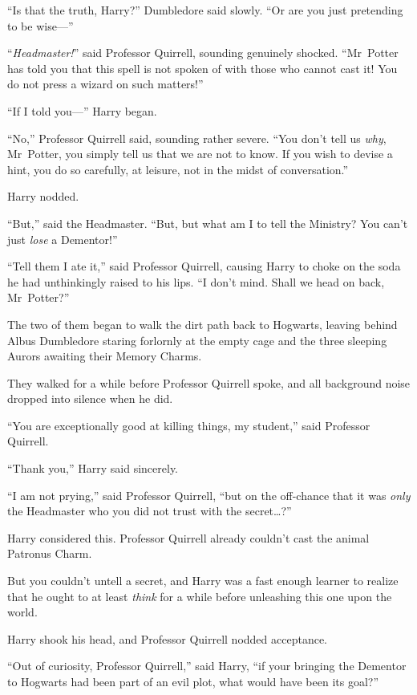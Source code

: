 “Is that the truth, Harry?” Dumbledore said slowly.
“Or are you just pretending to be wise—”

“\emph{Headmaster!}” said Professor Quirrell, sounding genuinely shocked.
“Mr~Potter has told you that this spell is not spoken of with those who cannot cast it! You do not press a wizard on such matters!”

“If I told you—” Harry began.

“No,” Professor Quirrell said, sounding rather severe.
“You don’t tell us \emph{why}, Mr~Potter, you simply tell us that we are not to know. If you wish to devise a hint, you do so carefully, at leisure, not in the midst of conversation.”

Harry nodded.

“But,” said the Headmaster.
“But, but what am I to tell the Ministry? You can’t just \emph{lose} a Dementor!”

“Tell them I ate it,” said Professor Quirrell, causing Harry to choke on the soda he had unthinkingly raised to his lips.
“I don’t mind. Shall we head on back, Mr~Potter?”

The two of them began to walk the dirt path back to Hogwarts, leaving behind Albus Dumbledore staring forlornly at the empty cage and the three sleeping Aurors awaiting their Memory Charms.


They walked for a while before Professor Quirrell spoke, and all background noise dropped into silence when he did.

“You are exceptionally good at killing things, my student,” said Professor Quirrell.

“Thank you,” Harry said sincerely.

“I am not prying,” said Professor Quirrell, “but on the off-chance that it was \emph{only} the Headmaster who you did not trust with the secret…?”

Harry considered this. Professor Quirrell already couldn’t cast the animal Patronus Charm.

But you couldn’t untell a secret, and Harry was a fast enough learner to realize that he ought to at least \emph{think} for a while before unleashing this one upon the world.

Harry shook his head, and Professor Quirrell nodded acceptance.

“Out of curiosity, Professor Quirrell,” said Harry, “if your bringing the Dementor to Hogwarts had been part of an evil plot, what would have been its goal?”

